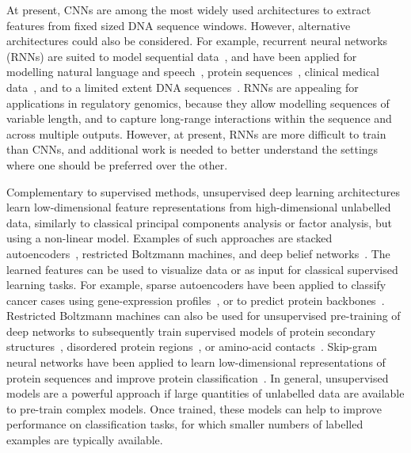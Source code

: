 At present, CNNs are among the most widely used architectures to extract features from fixed sized DNA sequence windows. However, alternative architectures could also be considered. For example, recurrent neural networks (RNNs) are suited to model sequential data~\citep{lipton_critical_2015}, and have been applied for modelling natural language and speech~\citep{che_distilling_2015,deng_deep_2015,graves_speech_2013,hinton_deep_2012,sutskever_sequence_2014,xiong_dynamic_2016}, protein sequences~\citep{agathocleous_protein_2010,sonderby_protein_2014}, clinical medical data~\citep{che_distilling_2015}, and to a limited extent DNA sequences~\citep{lee_dna-level_2015}. RNNs are appealing for applications in regulatory genomics, because they allow modelling sequences of variable length, and to capture long-range interactions within the sequence and across multiple outputs. However, at present, RNNs are more difficult to train than CNNs, and additional work is needed to better understand the settings where one should be preferred over the other.

Complementary to supervised methods, unsupervised deep learning architectures learn low-dimensional feature representations from high-dimensional unlabelled data, similarly to classical principal components analysis or factor analysis, but using a non-linear model. Examples of such approaches are stacked autoencoders~\citep{vincent_stacked_2010}, restricted Boltzmann machines, and deep belief networks~\citep{hinton_reducing_2006}. The learned features can be used to visualize data or as input for classical supervised learning tasks. For example, sparse autoencoders have been applied to classify cancer cases using gene-expression profiles~\citep{fakoor_using_2013}, or to predict protein backbones~\citep{lyons_predicting_2014-1}. Restricted Boltzmann machines can also be used for unsupervised pre-training of deep networks to subsequently train supervised models of protein secondary structures~\citep{spencer_deep_2015}, disordered protein regions~\citep{eickholt_predicting_2012,eickholt_dndisorder:_2013}, or amino-acid contacts~\citep{eickholt_predicting_2012}. Skip-gram neural networks have been applied to learn low-dimensional representations of protein sequences and improve protein classification~\citep{asgari_protvec:_2015}. In general, unsupervised models are a powerful approach if large quantities of unlabelled data are available to pre-train complex models. Once trained, these models can help to improve performance on classification tasks, for which smaller numbers of labelled examples are typically available.


